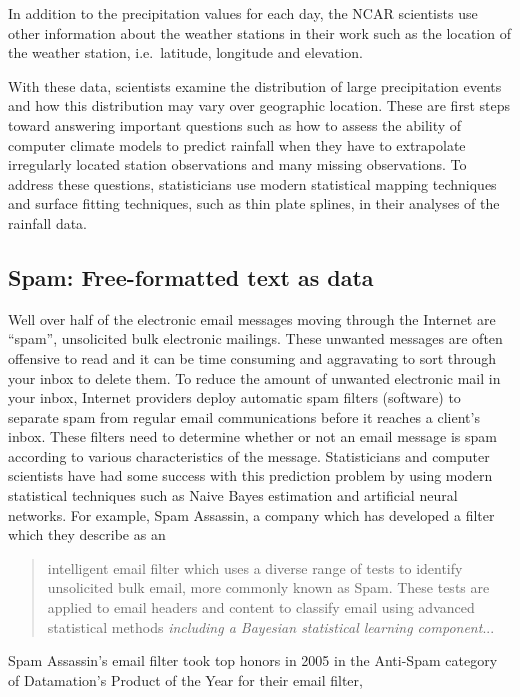 In addition to the precipitation values for each day, the NCAR
scientists use other information about the weather stations in their
work such as the location of the weather station, i.e.\ latitude,
longitude and elevation.

With these data, scientists examine the distribution of large
precipitation events and how this distribution may vary over
geographic location.  These are first steps toward answering important
questions such as how to assess the ability of computer climate models
to predict rainfall when they have to extrapolate irregularly located
station observations and many missing observations.  To address these
questions, statisticians use modern statistical mapping techniques and
surface fitting techniques, such as thin plate splines, in their
analyses of the rainfall data.

\subsection{Spam: Free-formatted text as data}
Well over half of the electronic email messages moving through the
Internet are ``spam'', unsolicited bulk electronic mailings.  These
unwanted messages are often offensive to read and it can be time
consuming and aggravating to sort through your inbox to delete them.
To reduce the amount of unwanted electronic mail in your inbox,
Internet providers deploy automatic spam filters (software) to
separate spam from regular email communications before it reaches a
client's inbox.  These filters need to determine whether or not an
email message is spam according to various characteristics of the
message.  Statisticians and computer scientists have had some success
with this prediction problem by using modern statistical techniques
such as Naive Bayes estimation and artificial neural networks.  For
example, Spam Assassin, a company which has developed a filter which
they describe as an
\begin{quote}
  intelligent email filter which uses a diverse range of tests to
  identify unsolicited bulk email, more commonly known as Spam.  These
  tests are applied to email headers and content to classify email
  using advanced statistical methods \textit{including a Bayesian
    statistical learning component}...
\end{quote}
Spam Assassin's email filter took top honors in 2005 in the Anti-Spam
category of Datamation's Product of the Year for their email filter,


